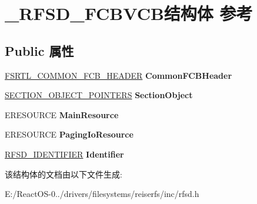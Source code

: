 \hypertarget{struct___r_f_s_d___f_c_b_v_c_b}{}\section{\+\_\+\+R\+F\+S\+D\+\_\+\+F\+C\+B\+V\+C\+B结构体 参考}
\label{struct___r_f_s_d___f_c_b_v_c_b}
\subsection*{Public 属性}
\begin{DoxyCompactItemize}
\item 
\mbox{\label{struct___r_f_s_d___f_c_b_v_c_b_ae6c20e04492f228aef518e0802232eab}} 
\hyperlink{struct___f_s_r_t_l___c_o_m_m_o_n___f_c_b___h_e_a_d_e_r}{F\+S\+R\+T\+L\+\_\+\+C\+O\+M\+M\+O\+N\+\_\+\+F\+C\+B\+\_\+\+H\+E\+A\+D\+ER} {\bfseries Common\+F\+C\+B\+Header}
\item 
\mbox{\label{struct___r_f_s_d___f_c_b_v_c_b_acca0bd77b69e466ae7cece948bd54336}} 
\hyperlink{struct___s_e_c_t_i_o_n___o_b_j_e_c_t___p_o_i_n_t_e_r_s}{S\+E\+C\+T\+I\+O\+N\+\_\+\+O\+B\+J\+E\+C\+T\+\_\+\+P\+O\+I\+N\+T\+E\+RS} {\bfseries Section\+Object}
\item 
\mbox{\label{struct___r_f_s_d___f_c_b_v_c_b_aa80d2a1a735f9423f91c6870668d528b}} 
E\+R\+E\+S\+O\+U\+R\+CE {\bfseries Main\+Resource}
\item 
\mbox{\label{struct___r_f_s_d___f_c_b_v_c_b_a9d7ad81ffb0ee2d5e11c9ff169503f4a}} 
E\+R\+E\+S\+O\+U\+R\+CE {\bfseries Paging\+Io\+Resource}
\item 
\mbox{\label{struct___r_f_s_d___f_c_b_v_c_b_ae762808ffad6b8b39d0a43986175b33c}} 
\hyperlink{struct___r_f_s_d___i_d_e_n_t_i_f_i_e_r}{R\+F\+S\+D\+\_\+\+I\+D\+E\+N\+T\+I\+F\+I\+ER} {\bfseries Identifier}
\end{DoxyCompactItemize}


该结构体的文档由以下文件生成\+:\begin{DoxyCompactItemize}
\item 
E\+:/\+React\+O\+S-\/0../drivers/filesystems/reiserfs/inc/rfsd.\+h\end{DoxyCompactItemize}

